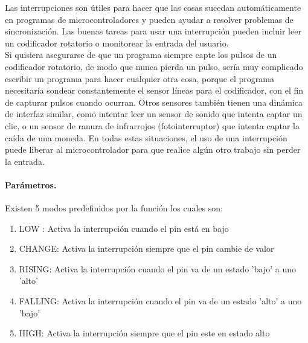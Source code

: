 \documentclass[11pt,letter
								]
								{article}
\begin{document}
% 

Las interrupciones son útiles para hacer que las cosas sucedan automáticamente en programas de microcontroladores y pueden ayudar a resolver problemas de sincronización. Las buenas tareas para usar una interrupción pueden incluir leer un codificador rotatorio o monitorear la entrada del usuario.\\
Si quisiera asegurarse de que un programa siempre capte los pulsos de un codificador rotatorio, de modo que nunca pierda un pulso, sería muy complicado escribir un programa para hacer cualquier otra cosa, porque el programa necesitaría sondear constantemente el sensor líneas para el codificador, con el fin de capturar pulsos cuando ocurran. Otros sensores también tienen una dinámica de interfaz similar, como intentar leer un sensor de sonido que intenta captar un clic, o un sensor de ranura de infrarrojos (fotointerruptor) que intenta captar la caída de una moneda. En todas estas situaciones, el uso de una interrupción puede liberar al microcontrolador para que realice algún otro trabajo sin perder la entrada.\cite{apard}\\
\newpage
\paragraph{Parámetros.}

Existen 5 modos predefinidos por la función los cuales son:\\

\begin{enumerate}
\item LOW : Activa la interrupción cuando el pin está en bajo \\
\item CHANGE: Activa la interrupción siempre que el pin cambie de valor \\
\item RISING: Activa la interrupción cuando el pin va de un estado 'bajo' a uno 'alto'\\
\item FALLING: Activa la interrupción cuando el pin va de un estado 'alto' a uno 'bajo'\\
\item HIGH: Activa la interrupción siempre que el pin este en estado alto \cite{TInterrup} 
\end{enumerate}
\end{document}
